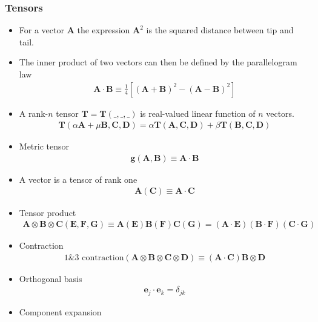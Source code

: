 \documentclass[10pt,a4paper]{article}
\theoremstyle{definition}
\begin{document}
\subsubsection{Tensors}
\begin{itemize}
\item For a vector $\mathbf{A}$ the expression $\mathbf{A}^2$ is the squared distance between tip and tail.
\item The inner product of two vectors can then be defined by the parallelogram law
\begin{align}
    \mathbf{A}\cdot\mathbf{B}\equiv\frac{1}{4}\left[(\mathbf{A}+\mathbf{B})^2-(\mathbf{A}-\mathbf{B})^2\right]
\end{align}
\item A rank-$n$ tensor $\mathbf{T}=\mathbf{T}(\_,\_,\_)$ is real-valued linear function of $n$ vectors.
\begin{align}
    \mathbf{T}(\alpha\mathbf{A}+\mu\mathbf{B},\mathbf{C},\mathbf{D})=\alpha\mathbf{T}(\mathbf{A},\mathbf{C},\mathbf{D})+\beta\mathbf{T}(\mathbf{B},\mathbf{C},\mathbf{D})
\end{align}
\item Metric tensor
\begin{align}
    \mathbf{g}(\mathbf{A},\mathbf{B})\equiv\mathbf{A}\cdot\mathbf{B}
\end{align}
\item A vector is a tensor of rank one 
\begin{align}
    \mathbf{A}(\mathbf{C})\equiv\mathbf{A}\cdot\mathbf{C}
\end{align}
\item Tensor product 
\begin{align}
    \mathbf{A}\otimes\mathbf{B}\otimes\mathbf{C}(\mathbf{E},\mathbf{F},\mathbf{G})\equiv\mathbf{A}(\mathbf{E})\mathbf{B}(\mathbf{F})\mathbf{C}(\mathbf{G})=(\mathbf{A}\cdot\mathbf{E})(\mathbf{B}\cdot\mathbf{F})(\mathbf{C}\cdot\mathbf{G})
\end{align}
\item Contraction
\begin{align}
    \text{1\&3 contraction}(\mathbf{A}\otimes\mathbf{B}\otimes\mathbf{C}\otimes\mathbf{D})\equiv(\mathbf{A}\cdot\mathbf{C})\mathbf{B}\otimes\mathbf{D}
\end{align}
\item Orthogonal basis
\begin{align}
    \mathbf{e}_j\cdot\mathbf{e}_k=\delta_{jk}
\end{align}
\item Component expansion

\end{itemize}
\end{document}
